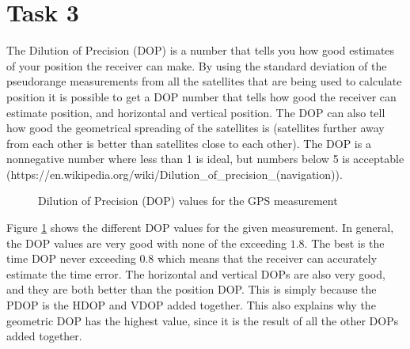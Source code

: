 \documentclass{article}
\begin{document}
\section*{Task 3}
The Dilution of Precision (DOP) is a number that tells you how good estimates of your position the receiver can make. By using the standard deviation of the pseudorange measurements from all the satellites that are being used to calculate position it is possible to get a DOP number that tells how good the receiver can estimate position, and horizontal and vertical position. The DOP can also tell how good the geometrical spreading of the satellites is (satellites further away from each other is better than satellites close to each other). The DOP is a nonnegative number where less than 1 is ideal, but numbers below 5 is acceptable (https://en.wikipedia.org/wiki/Dilution\_of\_precision\_(navigation)).

\begin{figure}[!ht]
    \centering
    \caption{Dilution of Precision (DOP) values for the GPS measurement}
    \label{fig:dop}
\end{figure}

Figure \ref{fig:dop} shows the different DOP values for the given measurement. In general, the DOP values are very good with none of the exceeding $1.8$. The best is the time DOP never exceeding $0.8$ which means that the receiver can accurately estimate the time error. The horizontal and vertical DOPs are also very good, and they are both better than the position DOP. This is simply because the PDOP is the HDOP and VDOP added together. This also explains why the geometric DOP has the highest value, since it is the result of all the other DOPs added together.
\end{document}
